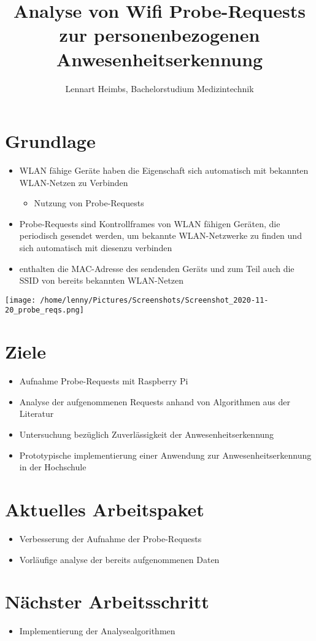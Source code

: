 \documentclass[10pt,a4paper,ngerman]{article}
\title{\textbf{Analyse von Wifi Probe-Requests zur personenbezogenen Anwesenheitserkennung}}
\author{Lennart Heimbs, Bachelorstudium Medizintechnik}
\begin{document}
    \maketitle

    \section*{Grundlage}
    \begin{itemize}
        \item WLAN fähige Geräte haben die Eigenschaft sich automatisch mit bekannten WLAN-Netzen zu Verbinden
        \begin{itemize}
           \item Nutzung von Probe-Requests
        \end{itemize}
        \item Probe-Requests sind Kontrollframes von WLAN fähigen Geräten, die periodisch gesendet werden, um bekannte WLAN-Netzwerke zu finden und sich automatisch mit diesenzu verbinden
        \item enthalten die MAC-Adresse des sendenden Geräts und zum Teil auch die SSID von bereits bekannten WLAN-Netzen
    \end{itemize}
    \texttt{[image: /home/lenny/Pictures/Screenshots/Screenshot\_2020-11-20\_probe\_reqs.png]}
    \\

    \section*{Ziele}
    \begin{itemize}
        \item Aufnahme Probe-Requests mit Raspberry Pi
        \item Analyse der aufgenommenen Requests anhand von Algorithmen aus der Literatur
        \item Untersuchung bezüglich Zuverlässigkeit der Anwesenheitserkennung
        \item Prototypische implementierung einer Anwendung zur Anwesenheitserkennung in der Hochschule
    \end{itemize}

    \section*{Aktuelles Arbeitspaket}
    \begin{itemize}
        \item Verbesserung der Aufnahme der Probe-Requests
        \item Vorläufige analyse der bereits aufgenommenen Daten
    \end{itemize}

    \section*{Nächster Arbeitsschritt}
    \begin{itemize}
        \item Implementierung der Analysealgorithmen
    \end{itemize}
\end{document}
